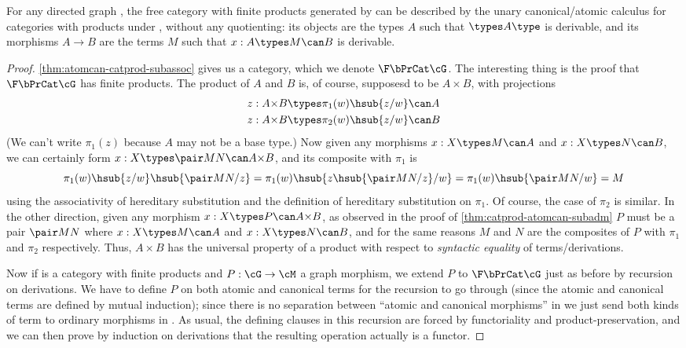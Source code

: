 \begin{thm}\label{thm:atomcan-catprod-initial}
  For any directed graph \cG, the free category with finite products generated by \cG can be described by the unary canonical/atomic calculus for categories with products under \cG, without any quotienting: its objects are the types $A$ such that $\types A\type$ is derivable, and its morphisms $A\to B$ are the terms $M$ such that $x:A \types M\can B$ is derivable.
\end{thm}
\begin{proof}
  \cref{thm:atomcan-catprod-subassoc} gives us a category, which we denote $\F\bPrCat\cG$.
  The interesting thing is the proof that $\F\bPrCat\cG$ has finite products.
  The product of $A$ and $B$ is, of course, supposesd to be $A\times B$, with projections
  \begin{align*}
    z:A\times B &\types \pi_1(w)\hsub{z/w}\can A\\
    z:A\times B &\types \pi_2(w)\hsub{z/w}\can B
  \end{align*}
  (We can't write $\pi_1(z)$ because $A$ may not be a base type.)
  Now given any morphisms $x:X \types M\can A$ and $x:X \types N\can B$, we can certainly form $x:X \types \pair M N \can A\times B$, and its composite with $\pi_1$ is
  \[ \pi_1(w)\hsub{z/w}\hsub{\pair M N/z} = \pi_1(w)\hsub{z\hsub{\pair M N/z}/w} = \pi_1(w)\hsub{\pair M N/w} = M \]
  using the associativity of hereditary substitution and the definition of hereditary substitution on $\pi_1$.
  Of course, the case of $\pi_2$ is similar.
  In the other direction, given any morphism $x:X \types P\can A\times B$, as observed in the proof of \cref{thm:catprod-atomcan-subadm} $P$ must be a pair $\pair M N$ where $x:X\types M\can A$ and $x:X\types N\can B$, and for the same reasons $M$ and $N$ are the composites of $P$ with $\pi_1$ and $\pi_2$ respectively.
  Thus, $A\times B$ has the universal property of a product with respect to \emph{syntactic equality} of terms/derivations.

  Now if \cM is a category with finite products and $P:\cG\to\cM$ a graph morphism, we extend $P$ to $\F\bPrCat\cG$ just as before by recursion on derivations.
  We have to define $P$ on both atomic and canonical terms for the recursion to go through (since the atomic and canonical terms are defined by mutual induction); since there is no separation between ``atomic and canonical morphisms'' in \cM we just send both kinds of term to ordinary morphisms in \cM.
  As usual, the defining clauses in this recursion are forced by functoriality and product-preservation, and we can then prove by induction on derivations that the resulting operation actually is a functor.
\end{proof}


